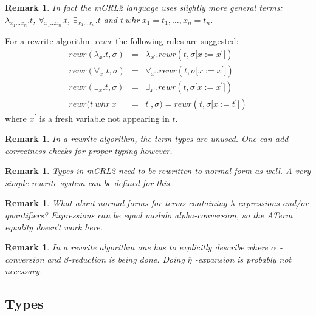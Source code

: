 \documentclass{article}
\newtheorem{remark}[theorem]{Remark}
\begin{document}
\begin{remark}
In fact the mCRL2 language uses slightly more general terms: $\lambda
_{x_{1}\ldots x_{n}}.t$, $\forall _{x_{1}\ldots x_{n}}.t$, $\exists
_{x_{1}\ldots x_{n}}.t$ and $t\ whr\ x_{1}=t_{1},\ldots ,x_{n}=t_{n}$.
\end{remark}

For a rewrite algorithm $rewr$ the following rules are suggested:%
\begin{eqnarray*}
rewr(\lambda _{x}.t,\sigma ) &=&\lambda _{x^{\prime }}.rewr(t,\sigma \lbrack
x:=x^{\prime }]) \\
rewr(\forall _{x}.t,\sigma ) &=&\forall _{x^{\prime }}.rewr(t,\sigma \lbrack
x:=x^{\prime }]) \\
rewr(\exists _{x}.t,\sigma ) &=&\exists _{x^{\prime }}.rewr(t,\sigma \lbrack
x:=x^{\prime }]) \\
rewr(t\ whr\ x &=&t^{\prime },\sigma )=rewr(t,\sigma \lbrack x:=t^{\prime }])
\end{eqnarray*}%
where $x^{\prime }$ is a fresh variable not appearing in $t$.

\begin{remark}
In a rewrite algorithm, the term types are unused. One can add correctness
checks for proper typing however.
\end{remark}

\begin{remark}
Types in mCRL2 need to be rewritten to normal form as well. A very simple
rewrite system can be defined for this. 
\end{remark}

\begin{remark}
What about normal forms for terms containing $\lambda $-expressions and/or
quantifiers? Expressions can be equal modulo alpha-conversion, so the ATerm
equality doesn't work here.
\end{remark}

\begin{remark}
In a rewrite algorithm one has to explicitly describe where $\alpha $%
-conversion and $\beta $-reduction is being done. Doing $\overline{\eta }$%
-expansion is probably not necessary.
\end{remark}

\subsection{Types}
\end{document}
